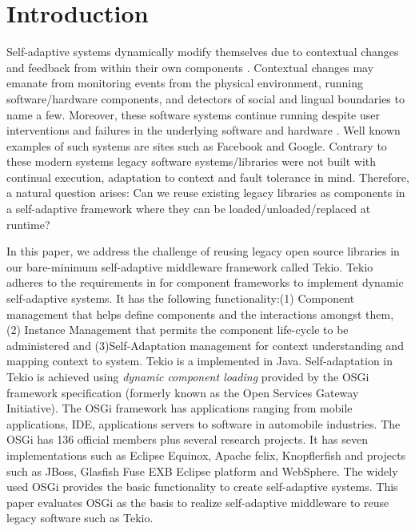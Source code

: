 \documentclass{acm_proc_article-sp}
\begin{document}



\section{Introduction}
\label{sec:introduction}

Self-adaptive systems dynamically modify themselves due to contextual changes and feedback from within their own components \cite{Oreizy}. Contextual changes may emanate from monitoring events from the physical environment, running software/hardware components, and detectors of social and lingual boundaries to name a few. Moreover, these software systems continue running  despite user interventions and failures in the underlying software and hardware \cite{Brun2009}. Well known examples of such systems are sites such as Facebook and Google.  Contrary to these modern systems legacy software systems/libraries were not built with continual execution, adaptation to context and fault tolerance in mind. Therefore, a natural question arises: Can we reuse existing legacy libraries as components in a self-adaptive framework where they can be loaded/unloaded/replaced at runtime?

In this paper, we address the challenge of reusing legacy open source libraries in our bare-minimum self-adaptive middleware framework called Tekio. Tekio adheres to the requirements in  \cite{Hallsteinsen2006} for component frameworks to implement dynamic self-adaptive systems. It has the following functionality:(1) Component management that helps define components and the interactions amongst them, (2) Instance Management that permits the component life-cycle to be administered and (3)Self-Adaptation management for context understanding and mapping context to system. Tekio is a implemented in Java. Self-adaptation in Tekio is achieved using \emph{dynamic component loading}  provided by the  OSGi framework specification (formerly known as the Open Services Gateway Initiative). The OSGi framework has applications ranging from mobile applications, IDE, applications servers to software in automobile industries. The OSGi has 136 official members plus several research projects. It has seven implementations such as Eclipse Equinox, Apache felix, Knopflerfish and projects such as JBoss, Glasfish Fuse EXB Eclipse platform and WebSphere. The widely used OSGi provides the basic functionality to create self-adaptive systems. This paper evaluates OSGi as the basis to realize self-adaptive middleware to reuse legacy software such as Tekio.
\end{document}

